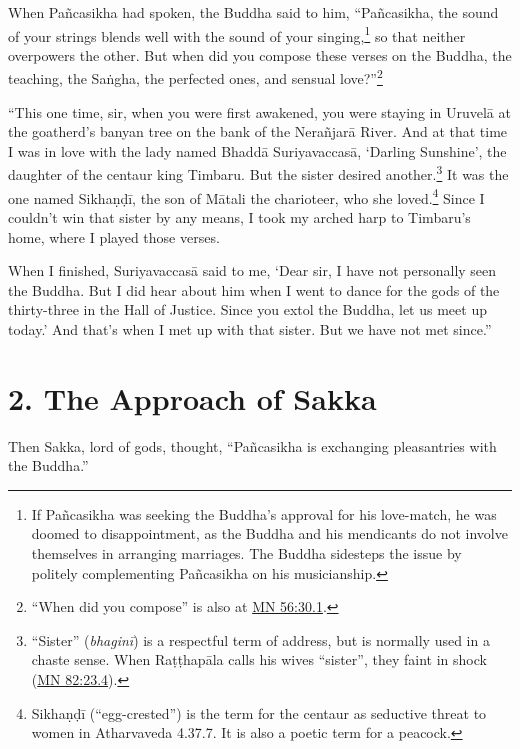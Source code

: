 \documentclass[12pt,openany]{book}%
\begin{document}
When \textsanskrit{Pañcasikha} had spoken, the Buddha said to him, “\textsanskrit{Pañcasikha}, the sound of your strings blends well with the sound of your singing,\footnote{If \textsanskrit{Pañcasikha} was seeking the Buddha’s approval for his love-match, he was doomed to disappointment, as the Buddha and his mendicants do not involve themselves in arranging marriages. The Buddha sidesteps the issue by politely complementing \textsanskrit{Pañcasikha} on his musicianship. } so that neither overpowers the other. But when did you compose these verses on the Buddha, the teaching, the \textsanskrit{Saṅgha}, the perfected ones, and sensual love?”\footnote{“When did you compose” is also at \href{https://suttacentral.net/mn56/en/sujato\#30.1}{MN 56:30.1}. } 

“This one time, sir, when you were first awakened, you were staying in \textsanskrit{Uruvelā} at the goatherd’s banyan tree on the bank of the \textsanskrit{Nerañjarā} River. And at that time I was in love with the lady named \textsanskrit{Bhaddā} \textsanskrit{Suriyavaccasā}, ‘Darling Sunshine’, the daughter of the centaur king Timbaru. But the sister desired another.\footnote{“Sister” (\textit{\textsanskrit{bhaginī}}) is a respectful term of address, but is normally used in a chaste sense. When \textsanskrit{Raṭṭhapāla} calls his wives “sister”, they faint in shock (\href{https://suttacentral.net/mn82/en/sujato\#23.4}{MN 82:23.4}). } It was the one named \textsanskrit{Sikhaṇḍī}, the son of \textsanskrit{Mātali} the charioteer, who she loved.\footnote{\textsanskrit{Sikhaṇḍī} (“egg-crested”) is the term for the centaur as seductive threat to women in Atharvaveda 4.37.7. It is also a poetic term for a peacock. } Since I couldn’t win that sister by any means, I took my arched harp to Timbaru’s home, where I played those verses. 

When I finished, \textsanskrit{Suriyavaccasā} said to me, ‘Dear sir, I have not personally seen the Buddha. But I did hear about him when I went to dance for the gods of the thirty-three in the Hall of Justice. Since you extol the Buddha, let us meet up today.’ And that’s when I met up with that sister. But we have not met since.” 

\section*{2. The Approach of Sakka }

Then Sakka, lord of gods, thought, “\textsanskrit{Pañcasikha} is exchanging pleasantries with the Buddha.” 
\end{document}
